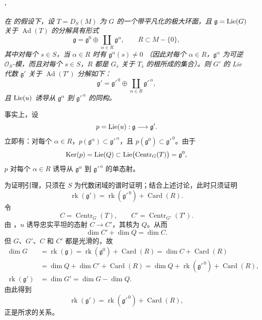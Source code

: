 \paragraph{.}
\textit{在  的假设下，设 \(T=D_S(M)\) 为 \(G\) 的一个带平凡化的极大环面，且 \(\mathfrak g=\operatorname{Lie}(G)\) 关于 \(\operatorname{Ad}(T)\) 的分解具有形式}
\[
  \mathfrak g
  =
  \mathfrak g^0
  \oplus
  \coprod_{\alpha\in R}\mathfrak g^\alpha,
  \qquad
  R\subset M-\{0\},
\]
\textit{其中对每个 \(s\in S\)，当 \(\alpha\in R\) 时有 \(\mathfrak g^\alpha(s)\ne0\) \textup{（因此对每个 \(\alpha\in R\)，\(\mathfrak g^\alpha\) 为可逆 \(\mathcal O_S\)-模，而且对每个 \(s\in S\)，\(R\) 都是 \(G_{\bar s}\) 关于 \(T_{\bar s}\) 的根所成的集合）}。则 \(G'\) 的 Lie 代数 \(\mathfrak g'\) 关于 \(\operatorname{Ad}(T')\) 分解如下：}
\[
  \mathfrak g'
  =
  \mathfrak g'^{\,0}
  \oplus
  \coprod_{\alpha\in R}\mathfrak g'^{\,\alpha},
\]
\textit{且 \(\operatorname{Lie}(u)\) 诱导从 \(\mathfrak g^\alpha\) 到 \(\mathfrak g'^{\,\alpha}\) 的同构。}

事实上，设
\[
  p=\operatorname{Lie}(u):\mathfrak g\longrightarrow\mathfrak g'.
\]
立即有：对每个 \(\alpha\in R\)，\(p(\mathfrak g^\alpha)\subset\mathfrak g'^{\,\alpha}\)，且 \(p(\mathfrak g^0)\subset\mathfrak g'^{\,0}\)。由于
\[
  \operatorname{Ker}(p)
  =
  \operatorname{Lie}(Q)
  \subset
  \operatorname{Lie}\bigl(\operatorname{Centr}_G(T)\bigr)
  =
  \mathfrak g^0,
\]
\(p\) 对每个 \(\alpha\in R\) 诱导从 \(\mathfrak g^\alpha\) 到 \(\mathfrak g'^{\,\alpha}\) 的单态射。

为证明引理，只须在 \(S\) 为代数闭域的谱时证明；结合上述讨论，此时只须证明
\[
  \operatorname{rk}(\mathfrak g')
  =
  \operatorname{rk}(\mathfrak g'^{\,0})
  +
  \operatorname{Card}(R).
\]
令
\[
  C=\operatorname{Centr}_G(T),
  \qquad
  C'=\operatorname{Centr}_{G'}(T').
\]
由 \textup{}，\(u\) 诱导忠实平坦的态射 \(C\to C'\)，其核为 \(Q\)。从而
\[
  \dim C'+\dim Q=\dim C.
\]
但 \(G\)、\(G'\)、\(C\) 和 \(C'\) 都是光滑的，故
\[
\begin{aligned}
  \dim G
  &=
  \operatorname{rk}(\mathfrak g)
   =
  \operatorname{rk}(\mathfrak g^0)+\operatorname{Card}(R)
   =
  \dim C+\operatorname{Card}(R)
  \\
  &=
  \dim Q+\dim C'+\operatorname{Card}(R)
   =
  \dim Q+\operatorname{rk}(\mathfrak g'^{\,0})
  +\operatorname{Card}(R),
  \\
  \operatorname{rk}(\mathfrak g')
  &=
  \dim G'
   =
  \dim G-\dim Q.
\end{aligned}
\]
由此得到
\[
  \operatorname{rk}(\mathfrak g')
  =
  \operatorname{rk}(\mathfrak g'^{\,0})
  +
  \operatorname{Card}(R),
\]
正是所求的关系。

